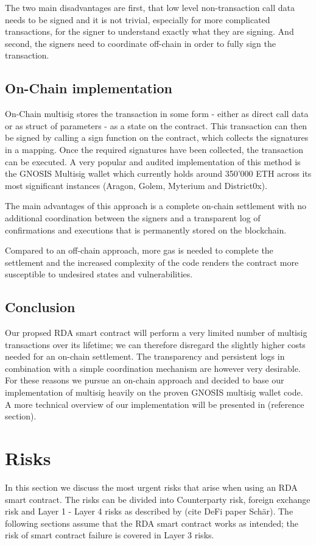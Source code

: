 \documentclass[12pt,a4paper,titlepage,oneside,english]{article}
\begin{document}
The two main disadvantages are first, that low level non-transaction call data needs to be signed and it is not trivial, especially for more complicated transactions, for the signer to understand exactly what they are signing. And second, the signers need to coordinate off-chain in order to fully sign the transaction.

\subsection{On-Chain implementation}
On-Chain multisig stores the transaction in some form - either as direct call data or as struct of parameters - as a state on the contract. This transaction can then be signed by calling a sign function on the contract, which collects the signatures in a mapping. Once the required signatures have been collected, the transaction can be executed. A very popular and audited implementation of this method is the GNOSIS Multisig wallet which currently holds around 350'000 ETH across its most significant instances (Aragon, Golem, Myterium and District0x).

The main advantages of this approach is a complete on-chain settlement with no additional coordination between the signers and a transparent log of confirmations and executions that is permanently stored on the blockchain.

Compared to an off-chain approach, more gas is needed to complete the settlement and the increased complexity of the code renders the contract more susceptible to undesired states and vulnerabilities.

\subsection{Conclusion}
Our propsed RDA smart contract will perform a very limited number of multisig transactions over its lifetime; we can therefore disregard the slightly higher costs needed for an on-chain settlement. The transparency and persistent logs in combination with a simple coordination mechanism are however very desirable. For these reasons we pursue an on-chain approach and decided to base our implementation of multisig heavily on the proven GNOSIS multisig wallet code. A more technical overview of our implementation will be presented in (reference section).


\section{Risks}
In this section we discuss the most urgent risks that arise when using an RDA smart contract. The risks can be divided into Counterparty risk, foreign exchange risk and Layer 1 - Layer 4 risks as described by (cite DeFi paper Schär). The following sections assume that the RDA smart contract works as intended; the risk of smart contract failure is covered in Layer 3 risks.
\end{document}
